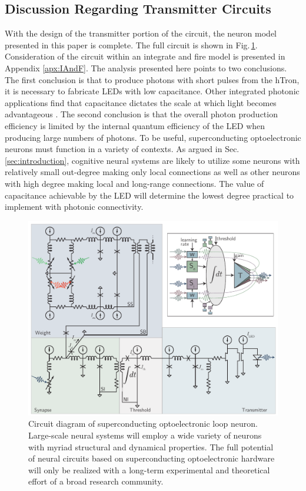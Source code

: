 \documentclass[twocolumn]{article}
\begin{document}
\subsection{\label{sec:discussion_transmitterCircuits}Discussion Regarding Transmitter Circuits}
With the design of the transmitter portion of the circuit, the neuron model presented in this paper is complete. The full circuit is shown in Fig.\,\ref{fig:transmitters_fullCircuit}. Consideration of the circuit within an integrate and fire model is presented in Appendix \ref{apx:IAndF}. The analysis presented here points to two conclusions. The first conclusion is that to produce photons with short pulses from the hTron, it is necessary to fabricate LEDs with low capacitance. Other integrated photonic applications find that capacitance dictates the scale at which light becomes advantageous \cite{mi2017}. The second conclusion is that the overall photon production efficiency is limited by the internal quantum efficiency of the LED when producing large numbers of photons. To be useful, superconducting optoelectronic neurons must function in a variety of contexts. As argued in Sec.\,\ref{sec:introduction}, cognitive neural systems are likely to utilize some neurons with relatively small out-degree making only local connections as well as other neurons with high degree making local and long-range connections. The value of capacitance achievable by the LED will determine the lowest degree practical to implement with photonic connectivity.
\begin{figure}[t!]
	\centerline{\includegraphics[width=17.2cm]{_transmitters_fullCircuit_small.pdf}}
	\caption{\label{fig:transmitters_fullCircuit}Circuit diagram of superconducting optoelectronic loop neuron. Large-scale neural systems will employ a wide variety of neurons with myriad structural and dynamical properties. The full potential of neural circuits based on superconducting optoelectronic hardware will only be realized with a long-term experimental and theoretical effort of a broad research community.}
\end{figure}
\end{document}
